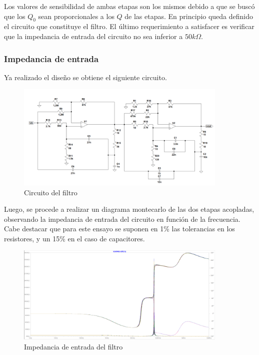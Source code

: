 Los valores de sensibilidad de ambas etapas son los mismos debido a que se busc\'o que los $Q_0$ sean proporcionales a los $Q$ de las etapas.
En principio queda definido el circuito que constituye el filtro. El \'ultimo requerimiento a satisfacer es verificar que la impedancia de entrada del circuito no sea inferior a $50k\Omega$.

\subsubsection{Impedancia de entrada}

Ya realizado el dise\~no se obtiene el siguiente circuito.

\begin{figure}[H]
    \centering
    \includegraphics[width=0.9\textwidth]{../EJ3/Resources/filter_unbuffered.png}
    \caption{Circuito del filtro}
     \label{EJ3_FILTER_CIRCUIT_UNBUFFERED}
\end{figure}

Luego, se procede a realizar un diagrama montecarlo de las dos etapas acopladas, observando la impedancia de entrada del circuito en funci\'on de la frecuencia. Cabe destacar que para este ensayo se suponen en 1\% las tolerancias en los resistores, y un 15\% en el caso de capacitores.

\begin{figure}[H]
    \centering
    \includegraphics[width=0.9\textwidth]{../EJ3/Resources/zin_unbuffered.png}
    \caption{Impedancia de entrada del filtro}
     \label{EJ3_FILTER_ZIN_NOBUFF}
\end{figure}

